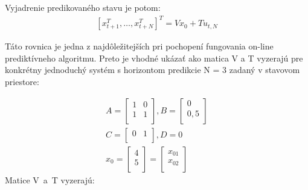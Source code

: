 Vyjadrenie predikovaného stavu je potom:
\begin{equation} \label{eq6}
\begin{split}
[ x_{t+1}^T,…,x_{t+N}^T  ]^T=Vx_0+Tu_{t,N}
\end{split}
\end{equation}

Táto rovnica je jedna z najdôležitejších pri pochopení fungovania on-line prediktívneho algoritmu. Preto je vhodné ukázať ako matica V a T vyzerajú pre konkrétny jednoduchý systém s horizontom predikcie N = 3 zadaný v stavovom priestore:

\begin{equation} \label{eq7}
\begin{split}
A = \begin{bmatrix}
1 & 0 \\
1 & 1 \\
\end{bmatrix}, 
B = \begin{bmatrix}
0 \\
0,5 \\
\end{bmatrix} \\
C = \begin{bmatrix}
0 & 1 \\
\end{bmatrix}, D = 0 \\
x_{0} = \begin{bmatrix}
4 \\
5 \\
\end{bmatrix} = \begin{bmatrix}
x_{01} \\
x_{02} \\
\end{bmatrix}
\end{split}
\end{equation}
Matice V~a~T vyzerajú:
